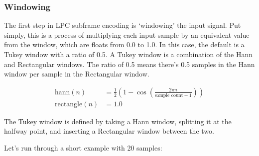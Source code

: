 \begin{figure}[h]
\qquad
{}
\end{figure}

\pagebreak

\subsubsection{Windowing}

The first step in LPC subframe encoding is `windowing' the input signal.
Put simply, this is a process of multiplying each input sample by
an equivalent value from the window, which are floats from 0.0 to 1.0.
In this case, the default is a Tukey window with a ratio of 0.5.
A Tukey window is a combination of the Hann and Rectangular windows.
The ratio of 0.5 means there's 0.5 samples in the Hann window per
sample in the Rectangular window.

\begin{align}
\text{hann}(n) &= \frac{1}{2} \left ( 1 - \cos \left ( \frac{2 \pi n}{\text{sample count} - 1} \right ) \right ) \\
\text{rectangle}(n) &= 1.0
\end{align}

The Tukey window is defined by taking a Hann window, splitting it at
the halfway point, and inserting a Rectangular window between the
two.

\begin{figure}[h]
\end{figure}

Let's run through a short example with 20 samples:

